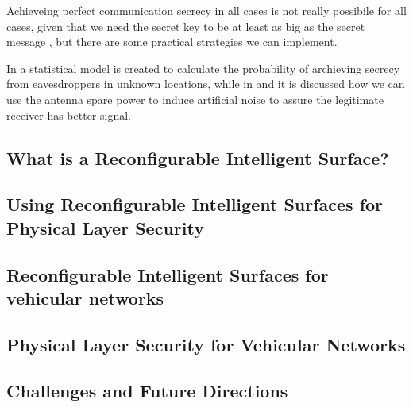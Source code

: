 \documentclass[conference]{IEEEtran}
\begin{document}
Achieveing perfect communication secrecy in all cases is not really possibile for all cases, given that we need the secret key to be at least as big as the secret message \cite{6769090}, but there are some practical strategies we can implement.

In \cite{7543509} a statistical model is created to calculate the probability of archieving secrecy from eavesdroppers in unknown locations, while in \cite{4543070} and \cite{1605889} it is discussed how we can use the antenna spare power to induce artificial noise to assure the legitimate receiver has better signal.

\subsection{What is a Reconfigurable Intelligent Surface?}
\subsection{Using Reconfigurable Intelligent Surfaces for Physical Layer Security}
\subsection{Reconfigurable Intelligent Surfaces for vehicular networks}
\subsection{Physical Layer Security for Vehicular Networks}
\subsection{Challenges and Future Directions}

\newpage


\end{document}
